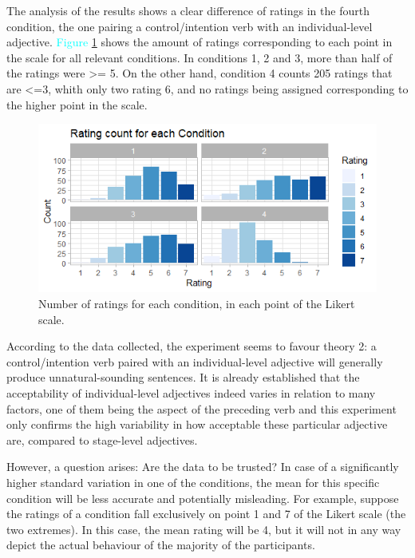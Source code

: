 \documentclass[12pt,a4paper]{article}
\begin{document}
The analysis of the results shows a clear difference of ratings in the fourth condition, the one pairing a control/intention verb with an individual-level adjective. \textcolor{cyan}{Figure \ref{Figure 1}} shows the amount of ratings corresponding to each point in the scale for all relevant conditions. In conditions 1, 2 and 3, more than half of the ratings were >= 5. On the other hand, condition 4 counts 205 ratings that are <=3, whith only two rating 6, and no ratings being assigned corresponding to the higher point in the scale.


\begin{figure}[h]
\centering
\captionsetup{font=scriptsize}
  \includegraphics[width=1\textwidth]{Rating_count.PNG}
  \caption{Number of ratings for each condition, in each point of the Likert scale.}
  \label{Figure 1}
\end{figure}

According to the data collected, the experiment seems to favour theory 2: a control/intention verb paired with an individual-level adjective will generally produce unnatural-sounding sentences. It is already established that the acceptability of individual-level adjectives indeed varies in relation to many factors, one of them being the aspect of the preceding verb \parencite{husband2006} and this experiment only confirms the high variability in how acceptable these particular adjective are, compared to stage-level adjectives.


However, a question arises: Are the data to be trusted? In case of a significantly higher standard variation in one of the conditions, the mean for this specific condition will be less accurate and potentially misleading. For example, suppose the ratings of a condition fall exclusively on point 1 and 7 of the Likert scale (the two extremes). In this case, the mean rating will be 4, but it will not in any way depict the actual behaviour of the majority of the participants.
\end{document}
